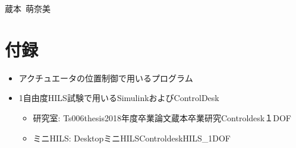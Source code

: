\documentclass[a4paper,12pt]{article_vdlab_sotsuron}
\begin{document}
\begin{flushright}
    蔵本~萌奈美
\end{flushright}


\newpage
\section*{付録}

\begin{itemize}
\item アクチュエータの位置制御で用いるプログラム
\item 1自由度HILS試験で用いるSimulinkおよびControlDesk
  \begin{itemize}
  \item 研究室: \yen\yen Ts006\yen thesis\yen 2018年度\yen 卒業論文\yen 蔵本\yen 卒業研究\yen Controldesk\yen １DOF
  \item ミニHILS: \yen\yen Desktop\yen ミニHILS\yen Controldesk\yen HILS\_1DOF
  \end{itemize}
\end{itemize}
\end{document}
